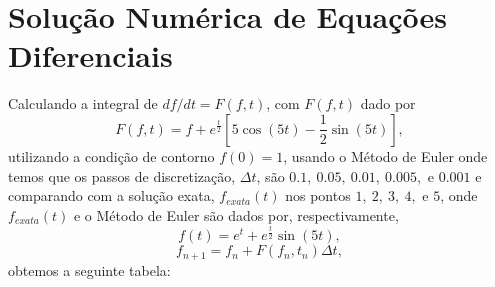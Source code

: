 \documentclass[pdftex,10pt,a4paper]{article}
\begin{document}
\section{Solução Numérica de Equações Diferenciais}
Calculando a integral de $df/dt = F(f,t)$, com $F(f,t)$ dado por
\begin{equation}
F(f,t) = f + e^{\frac{t}{2}}\left[5\cos(5t)-\frac{1}{2}\sin(5t)\right],
\end{equation}
utilizando a condição de contorno $f(0) = 1$, usando o Método de Euler onde temos que os passos de discretização, $\Delta t$, são $0.1,\ 0.05,\ 0.01,\ 0.005,$ e $0.001$ e comparando com a solução exata, $f_{exata}(t)$ nos pontos $1,\ 2,\ 3,\ 4,$ e $5$, onde $f_{exata}(t)$ e o Método de Euler são dados por, respectivamente,
\begin{equation}
f(t) = e^t + e^{\frac{t}{2}}\sin(5t),
\end{equation}
\begin{equation}
f_{n+1} = f_n + F(f_n,t_n)\Delta t,
\end{equation}
obtemos a seguinte tabela:
\end{document}
